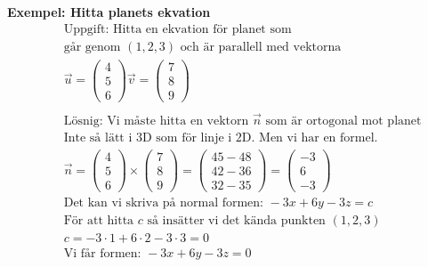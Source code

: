 \textbf{Exempel: Hitta planets ekvation}
\begin{align*}
  &\quad  \text{Uppgift: Hitta en ekvation för planet som } \\
  &\quad  \text{går genom $(1, 2, 3)$ och är parallell med vektorna } \\
  &\quad
  \vec{u} = \begin{pmatrix} 4 \\ 5 \\ 6 \end{pmatrix}
  \vec{v} = \begin{pmatrix} 7 \\ 8 \\ 9 \end{pmatrix} \\
  &\quad  \\
  &\quad  \text{Lösnig: Vi måste hitta en vektorn $\vec{n}$ som är ortogonal mot planet}  \\
  &\quad  \text{Inte så lätt i 3D som för linje i 2D. Men vi har en formel.} \\
  &\quad
  \vec{n} = \begin{pmatrix} 4 \\ 5 \\ 6 \end{pmatrix} \times
  \begin{pmatrix} 7 \\ 8 \\ 9 \end{pmatrix} =
  \begin{pmatrix} 45-48 \\ 42-36 \\ 32-35 \end{pmatrix} =
  \begin{pmatrix} -3 \\ 6 \\ -3 \end{pmatrix} \\
  &\quad  \text{Det kan vi skriva på normal formen: }
  -3x+6y-3z=c \\
  &\quad  \text{För att hitta $c$ så insätter vi det kända punkten $(1,2,3)$} \\
  &\quad  c = -3\cdot{1}+6\cdot{2}-3\cdot{3} = 0 \\
  &\quad  \text{Vi får formen: } -3x+6y-3z=0 \\
\end{align*}


